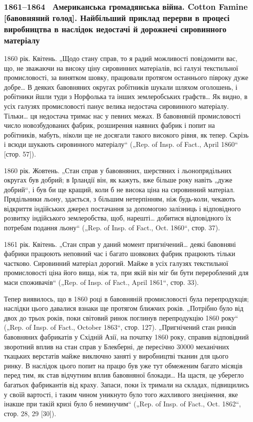\subsubsection{1861--1864~ Американська громадянська війна. Cotton Famine [бавовняний
голод]. Найбільший приклад перерви в процесі виробництва в наслідок
недостачі й дорожнечі сировинного матеріалу}

1860 рік. Квітень. „Щодо стану справ, то я радий можливості
повідомити вас, що, не зважаючи на високу ціну сировинних
матеріалів, всі галузі текстильної промисловості, за винятком
шовку, працювали протягом останнього півроку дуже добре\dots{}
В деяких бавовняних округах робітників шукали шляхом оголошень,
і робітники йшли туди з Норфолька та інших землеробських
графств\dots{} Як видно, в усіх галузях промисловості панує велика недостача
сировинного матеріалу. Тільки\dots{} ця недостача тримає нас
у певних межах. В бавовняній промисловості число новозбудованих
фабрик, розширення наявних фабрик і попит на робітників,
мабуть, ніколи ще не досягали такого високого рівня, як
тепер. Скрізь і всюди шукають сировинного матеріалу“ („Rep.
of Insp. of Fact., April 1860“ [стор. 57]).

1860 рік. Жовтень. „Стан справ у бавовняних, шерстяних
і льонопрядільних округах був добрий; в Ірландії він, як кажуть,
вже більше року навіть „дуже добрий“, і був би ще кращий,
коли б не висока ціна на сировинний матеріал. Прядільники
льону, здається, з більшим нетерпінням, ніж будь-коли,
чекають відкриття індійських джерел постачання за допомогою
залізниць і відповідного розвитку індійського землеробства, щоб,
нарешті\dots{} добитися відповідного їх потребам подання льону“
(„Rep. of Insp. of Fact., Oct. 1860“, стор. 37).

1861 рік. Квітень. „Стан справ у даний момент пригнічений\dots{}
деякі бавовняні фабрики працюють неповний час і багато шовкових
фабрик працюють тільки частково. Сировинний матеріал
дорогий. Майже в усіх галузях текстильної промисловості
ціна його вища, ніж та, при якій він міг би бути перероблений
для маси споживачів“ („Rep. of Insp. of Fact., April 1861“, стор. 33).

Тепер виявилось, що в 1860 році в бавовняній промисловості
була перепродукція; наслідки цього давалися взнаки ще протягом
ближчих років. „Потрібно було від двох до трьох років,
поки світовий ринок поглинув перепродукцію 1860 року“ („Rep.
of Insp. of Fact., October 1863“, стор. 127). „Пригнічений стан
ринків бавовняних фабрикатів у Східній Азії, на початку 1860 року,
справив відповідний зворотний вплив на стан справ у Блекберні,
де пересічно \num{30000} механічних ткацьких верстатів майже виключно
заняті у виробництві тканин для цього ринку. В наслідок
цього попит на працю був уже тут обмеженим багато місяців
перед тим, як став відчутним вплив бавовняної блокади\dots{}
На щастя, це уберегло багатьох фабрикантів від краху. Запаси,
поки їх тримали на складах, підвищились у своїй вартості, і таким
чином уникнуто було того жахливого знецінення, яке
інакше при такій кризі було б неминучим“ („Rep. of Insp. of
Fact., Oct. 1862“, стор. 28, 29 [30]).

